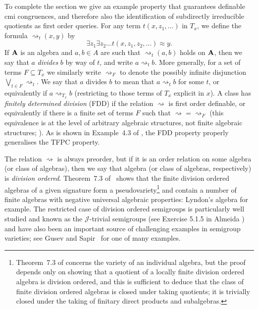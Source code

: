 \documentclass[10pt,a4paper]{amsart}
\theoremstyle{plain}
\theoremstyle{definition}
\newcommand{\divides}{\rightsquigarrow}
\begin{document}
To complete the section we give an example property that guarantees definable cmi congruences, and therefore also the identification of subdirectly irreducible quotients as first order queries.  For any term $t(x,z_1,\dots)$
in $T_x$, we define the formula ${\divides_t}(x,y)$ by 
\[
\exists z_1\exists z_2\dots t(x,z_1,z_2,\dots)\approx y.
\]
If ${\bf A}$ is an algebra and $a,b\in A$ are such that ${\divides_t}(a,b)$ holds on ${\bf A}$, then we say that  $a$ \emph{divides} $b$ by way of $t$, and write $a\divides_t b$.  More generally, for a set of terms $F\subseteq T_x$ we similarly write $\divides_F$ to denote the possibly infinite disjunction  $\bigvee_{t\in F}\divides_t$.  We say that $a$ divides $b$ to mean that $a\divides_tb$ for some $t$, or equivalently if $a\divides_{T_x}b$ (restricting to those terms of $T_x$ explicit in $x$).  A class has \emph{finitely determined division} (FDD) if the relation $\divides$ is first order definable, or equivalently if there is a finite set of terms $F$ such that ${\divides}={\divides_F}$ (this equivalence is at the level of arbitrary algebraic structures, not finite algebraic structures; \cite[Theorem 5.1]{jactro10}).  As is shown in Example~4.3 of \cite{jactro10}, the FDD property properly generalises the TFPC property.

The relation $\divides$ is always preorder, but if it is an order relation on some algebra (or class of algebras), then we say that algebra (or class of algebras, respectively) is \emph{division ordered}.    
Theorem~7.3 of~\cite{jactro10}  shows that the finite division ordered algebras of a given signature  form a pseudovariety\footnote{Theorem~7.3 of \cite{jactro10} concerns the variety of an individual algebra, but the proof  depends only on showing that a quotient of a locally finite division ordered algebra is division ordered, and this is sufficient to deduce that the class of finite division ordered algebras is closed under taking quotients; it is trivially closed under the taking of finitary direct products and  subalgebras.} and contain a number of finite algebras with negative universal algebraic properties: Lyndon's algebra \cite{lyn} for example.   The restricted case of division ordered semigroups is particularly well studied and known as the $\mathscr{J}$-trivial semigroups (see Exercise 5.1.5 in Almeida \cite{alm}) and have also been an important source of challenging examples in semigroup varieties; see Gusev and Sapir~\cite{gussap} for one of many examples.    
\end{document}
